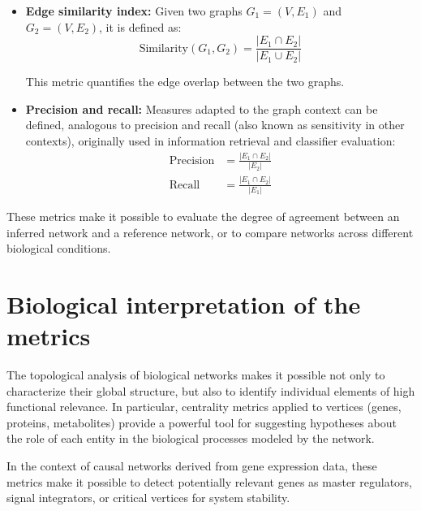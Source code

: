 \documentclass[12pt,a4paper]{report}
\begin{document}
\begin{itemize}
    \item \textbf{Edge similarity index:} Given two graphs \( G_1 = (V, E_1) \) and \( G_2 = (V, E_2) \), it is defined as:
\begin{equation}
\text{Similarity}(G_1, G_2) = \frac{|E_1 \cap E_2|}{|E_1 \cup E_2|}
\label{eq:similitud}
\end{equation}    
 
    This metric quantifies the edge overlap between the two graphs.

    \item \textbf{Precision and recall:} Measures adapted to the graph context can be defined, analogous to precision and recall (also known as sensitivity in other contexts), originally used in information retrieval and classifier evaluation\cite{recall}:
    \begin{align}
        \text{Precision} &= \frac{|E_1 \cap E_2|}{|E_2|} \\
        \text{Recall} &= \frac{|E_1 \cap E_2|}{|E_1|}
    \end{align}
\end{itemize}

These metrics make it possible to evaluate the degree of agreement between an inferred network and a reference network, or to compare networks across different biological conditions.




\section{Biological interpretation of the metrics}

The topological analysis of biological networks makes it possible not only to characterize their global structure, but also to identify individual elements of high functional relevance. In particular, centrality metrics applied to vertices (genes, proteins, metabolites) provide a powerful tool for suggesting hypotheses about the role of each entity in the biological processes modeled by the network.

In the context of causal networks derived from gene expression data, these metrics make it possible to detect potentially relevant genes as master regulators, signal integrators, or critical vertices for system stability. 
\end{document}
